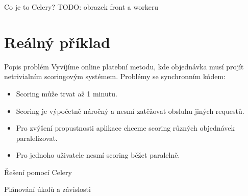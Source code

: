 \begin{slide}{Co je to Celery?}
TODO: obrazek front a workeru
\end{slide} 

\section{Reálný příklad} 
\begin{slide}{Popis problém}
 Vyvíjíme online platební metodu, kde objednávka musí projít netrivialním scoringovým systémem. Problémy se synchronním kódem: 
\begin{itemize}
    \item Scoring může trvat až 1 minutu.
    \item Scoring je výpočetně náročný a nesmí zatěžovat obsluhu jiných requestů.
    \item Pro zvýšení propustnosti aplikace chceme scoring různých objednávek paralelizovat.      
    \item Pro jednoho uživatele nesmí scoring běžet paralelně.
\end{itemize}
\end{slide}

\begin{slide}{Řešení pomocí Celery}
    
\end{slide}

\begin{slide}{Plánování úkolů a závislosti}
\end{slide} 
